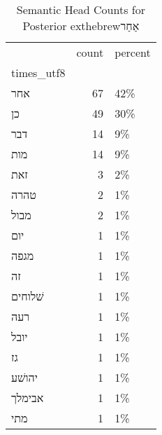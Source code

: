 \begin{table}[htbp!]
\centering
\caption{Semantic Head Counts for Posterior 	exthebrew{אַחַר}}
\label{table:post_>XR_head_ct}
\begin{tabular}{lrl}
\toprule
{} &  count & percent \\
times\_utf8 &        &         \\
\midrule
אחר        &     67 &     42\% \\
כן         &     49 &     30\% \\
דבר        &     14 &      9\% \\
מות        &     14 &      9\% \\
זאת        &      3 &      2\% \\
טהרה       &      2 &      1\% \\
מבול       &      2 &      1\% \\
יום        &      1 &      1\% \\
מגפה       &      1 &      1\% \\
זה         &      1 &      1\% \\
שׁלוחים    &      1 &      1\% \\
רעה        &      1 &      1\% \\
יובל       &      1 &      1\% \\
גז         &      1 &      1\% \\
יהושׁע     &      1 &      1\% \\
אבימלך     &      1 &      1\% \\
מתי        &      1 &      1\% \\
\bottomrule
\end{tabular}
\end{table}
